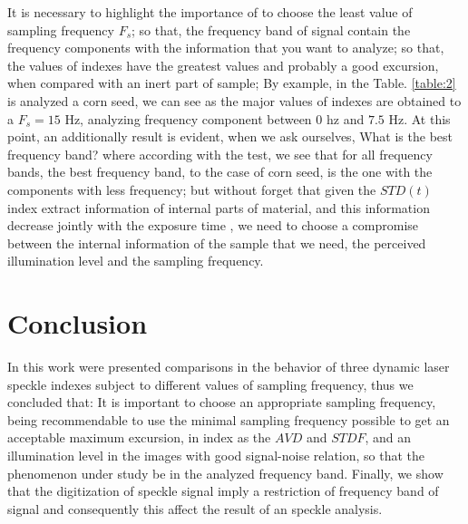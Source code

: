 \documentclass[review]{elsarticle}
\begin{document}
It is necessary to highlight the importance of to choose the least value of sampling frequency $F_s$;
so that, 
the frequency band of signal contain the frequency components with the information that you want to analyze;
so that, the values of indexes have the greatest values and probably a good excursion, 
when compared with an inert part of sample; 
By example, in the Table. \ref{table:2} is analyzed a corn seed, 
we can see as the major values of indexes are obtained to a $F_s=15$ Hz, 
analyzing frequency component between $0$ hz and $7.5$ Hz. At this point,
an additionally result is evident, when we ask ourselves, 
What is the best frequency band? where according with the test, we see that for
all frequency bands, 
the best frequency band, to the case of corn seed, is the one with the components with less frequency; but
without  forget that given the $STD(t)$ index extract information of internal parts of material, and
this information decrease jointly with the exposure time \cite{Nothdurft:05},
we need to choose a compromise between the internal information of the sample that we need, 
the perceived illumination level and the sampling frequency.
 

\section{Conclusion} 

In this work were presented comparisons in the  behavior of three dynamic laser speckle indexes
subject to different values of sampling frequency, thus we concluded that:
It is important to choose an appropriate sampling frequency, 
being recommendable to use the minimal sampling frequency possible to get an acceptable maximum excursion, 
in index as the $AVD$ and $STDF$,
and an illumination level in the images with good signal-noise relation,
so that the phenomenon under study be in the analyzed frequency band.
Finally, 
we show that the digitization  of speckle signal imply a restriction of frequency 
band of signal and consequently this affect the result of an speckle analysis.


\end{document}
